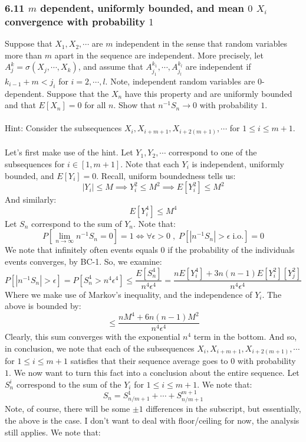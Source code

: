 \documentclass[12pt,a4paper]{article}
\newcommand{\1}[1]{\mathbbm{1}\left\{ #1 \right\}}
\newcommand{\io}{\text{i.o.}}
\begin{document}
\subsubsection{6.11 $m$ dependent, uniformly bounded, and mean $0$ $X_i$ convergence with probability $1$} Suppose that $X_1, X_2, \cdots$ are $m$ independent in the sense that random variables more than $m$ apart in the sequence are independent. More precisely, let $A_j^k = \sigma(X_j, \cdots, X_k)$, and assume that $A_{j_1}^{k_1}, \cdots, A_{j_l}^{k_l}$ are independent if $k_{i-1} + m < j_i$ for $i = 2, \cdots, l$. Note, independent random variables are $0$-dependent. Suppose that the $X_n$ have this property and are uniformly bounded and that $E[X_n] = 0$ for all $n$. Show that $n^{-1}S_n \to 0$ with probability $1$. 
\\\\
Hint: Consider the subsequences $X_i, X_{i+m+1}, X_{i+2(m+1)}, \cdots$ for $1 \leq i \leq m + 1$.
\\\\
Let's first make use of the hint. Let $Y_1, Y_2, \cdots$ correspond to one of the subsequences for $i \in [1, m + 1]$. Note that each $Y_i$ is independent, uniformly bounded, and $E[Y_i] = 0$. Recall, uniform boundedness tells us:
$$
	|Y_i| \leq M \implies Y_i^2 \leq M^2 \implies E[Y_i^2] \leq M^2
$$
And similarly:
$$
	E[Y_i^4] \leq M^4
$$
Let $S_n$ correspond to the sum of $Y_n$. Note that:
$$
	P\left[\lim_{n \to \infty} n^{-1}S_n = 0\right] = 1 \Leftrightarrow
	\forall \epsilon > 0 \;,\; P\left[|n^{-1}S_n| > \epsilon \;\io\right] = 0
$$
We note that infinitely often events equals 0 if the probability of the individuals events converges, by BC-1. So, we examine:
$$
	P\left[|n^{-1}S_n| > \epsilon\right] = P\left[S_n^4 > n^4\epsilon^4\right] \leq
	\frac{E[S_n^4]}{n^4\epsilon^4} = \frac{nE[Y_i^4] + 3n(n-1)E[Y_i^2][Y_j^2]}{n^4\epsilon^4}
$$
Where we make use of Markov's inequality, and the independence of $Y_i$. The above is bounded by:
$$
	\leq \frac{nM^4 + 6n(n-1)M^2}{n^4\epsilon^4}
$$
Clearly, this sum converges with the exponential $n^4$ term in the bottom. And so, in conclusion, we note that each of the subsequences $X_i, X_{i+m+1}, X_{i+2(m+1)}, \cdots$ for $1 \leq i \leq m + 1$ satisfies that their sequence average goes to $0$ with probability $1$. We now want to turn this fact into a conclusion about the entire sequence. Let $S^i_n$ correspond to the sum of the $Y_i$ for $1 \leq i \leq m+1$. We note that:
$$
	S_n = S^1_{n/m+1} + \cdots + S^{m+1}_{n/m+1}
$$
Note, of course, there will be some $\pm 1$ differences in the subscript, but essentially, the above is the case. I don't want to deal with floor/ceiling for now, the analysis still applies. We note that:
\end{document}
